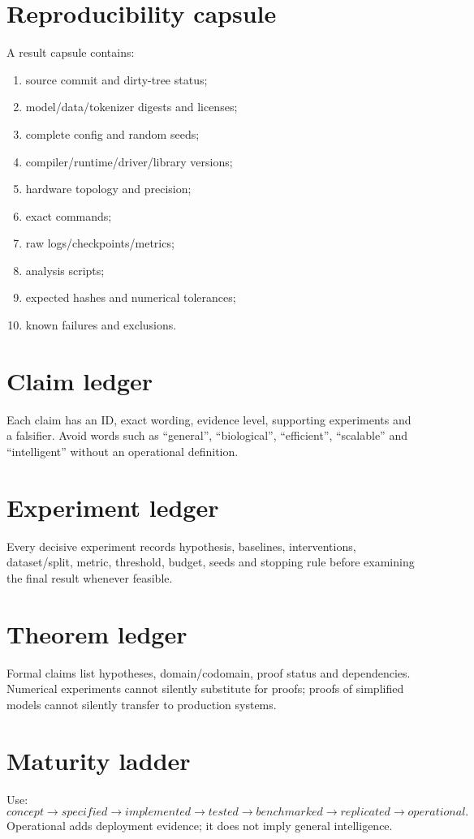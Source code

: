 \section{Reproducibility capsule}
A result capsule contains:
\begin{enumerate}
\item source commit and dirty-tree status;
\item model/data/tokenizer digests and licenses;
\item complete config and random seeds;
\item compiler/runtime/driver/library versions;
\item hardware topology and precision;
\item exact commands;
\item raw logs/checkpoints/metrics;
\item analysis scripts;
\item expected hashes and numerical tolerances;
\item known failures and exclusions.
\end{enumerate}

\section{Claim ledger}
Each claim has an ID, exact wording, evidence level, supporting experiments and a falsifier. Avoid words such as ``general'', ``biological'', ``efficient'', ``scalable'' and ``intelligent'' without an operational definition.

\section{Experiment ledger}
Every decisive experiment records hypothesis, baselines, interventions, dataset/split, metric, threshold, budget, seeds and stopping rule before examining the final result whenever feasible.

\section{Theorem ledger}
Formal claims list hypotheses, domain/codomain, proof status and dependencies. Numerical experiments cannot silently substitute for proofs; proofs of simplified models cannot silently transfer to production systems.

\section{Maturity ladder}
Use:
\[
concept\rightarrow specified\rightarrow implemented\rightarrow tested
\rightarrow benchmarked\rightarrow replicated\rightarrow operational.
\]
Operational adds deployment evidence; it does not imply general intelligence.

